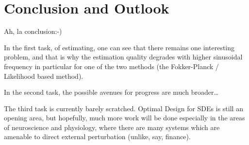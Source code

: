 \documentclass{report}
\begin{document}
\chapter{Conclusion and Outlook}
\label{ch:conclusion}
Ah, la conclusion:-) 

In the first task, of estimating, one can see that there remains one interesting
problem, and that is why the estimation quality degrades with higher sinusoidal
frequency in particular for one of the two methods (the
Fokker-Planck / Likelihood based method).

In the second task, the possible avenues for progress are much broader\ldots 

The third task is currently barely scratched. Optimal Design for SDEs is still
an opening area, but hopefully, much more work will be done especially in the
areas of neuroscience and physiology, where there are many systems which are
amenable to direct external perturbation (unlike, say, finance).


\cleardoublepage
% 


\end{document}

